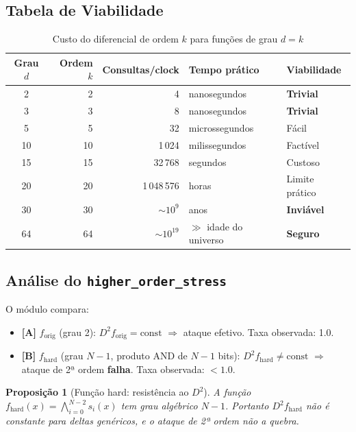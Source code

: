 \documentclass[12pt,a4paper]{article}
\newtheorem{proposition}[theorem]{Proposição}
\theoremstyle{definition}
\theoremstyle{remark}
\newcommand{\filter}{f}
\begin{document}
\subsection{Tabela de Viabilidade}

\begin{table}[H]
  \centering
  \caption{Custo do diferencial de ordem $k$ para funções de grau $d = k$}
  \begin{tabular}{crrll}
    \toprule
    Grau $d$ & Ordem $k$ & Consultas/clock & Tempo prático & Viabilidade \\
    \midrule
    2  & 2  & 4            & nanosegundos  & \textbf{Trivial} \\
    3  & 3  & 8            & nanosegundos  & \textbf{Trivial} \\
    5  & 5  & 32           & microssegundos & Fácil \\
    10 & 10 & 1\,024       & milissegundos & Factível \\
    15 & 15 & 32\,768      & segundos      & Custoso \\
    20 & 20 & 1\,048\,576  & horas         & Limite prático \\
    30 & 30 & $\sim 10^9$  & anos          & \textbf{Inviável} \\
    64 & 64 & $\sim 10^{19}$ & $\gg$ idade do universo & \textbf{Seguro} \\
    \bottomrule
  \end{tabular}
\end{table}

\subsection{Análise do \texttt{higher\_order\_stress}}

O módulo compara:
\begin{itemize}
  \item \textbf{[A]} $\filter_{\text{orig}}$ (grau 2): $D^2 \filter_{\text{orig}} = \text{const}$
        $\Rightarrow$ ataque efetivo. Taxa observada: 1.0.
  \item \textbf{[B]} $\filter_{\text{hard}}$ (grau $N-1$, produto AND de $N-1$
        bits): $D^2 \filter_{\text{hard}} \neq \text{const}$
        $\Rightarrow$ ataque de 2ª ordem \textbf{falha}. Taxa observada: $< 1.0$.
\end{itemize}

\begin{proposition}[Função hard: resistência ao $D^2$]
  A função $\filter_{\text{hard}}(x) = \bigwedge_{i=0}^{N-2} s_i(x)$
  tem grau algébrico $N-1$. Portanto $D^2 \filter_{\text{hard}}$ não é
  constante para deltas genéricos, e o ataque de 2ª ordem não a quebra.
\end{proposition}
\end{document}
